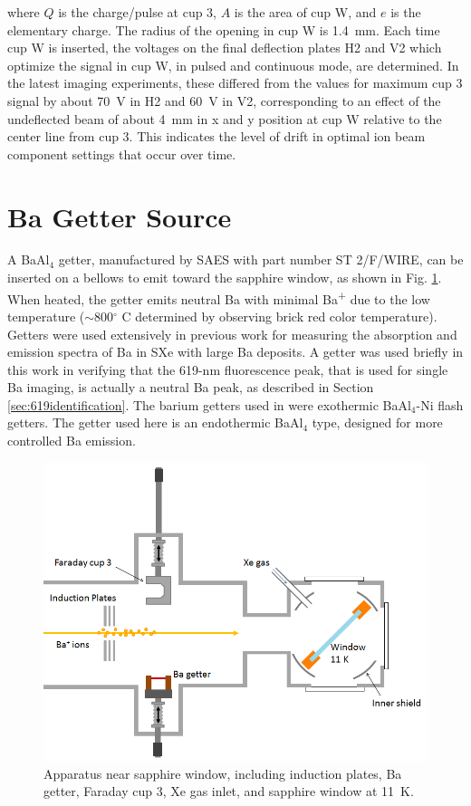 \noindent
where $Q$ is the charge/pulse at cup 3, $A$ is the area of cup W, and $e$ is the elementary charge.  The radius of the opening in cup W is 1.4~mm.  Each time cup W is inserted, the voltages on the final deflection plates H2 and V2 which optimize the signal in cup W, in pulsed and continuous mode, are determined.  In the latest imaging experiments, these differed from the values for maximum cup 3 signal by about 70~V in H2 and 60~V in V2, corresponding to an effect of the undeflected beam of about 4~mm in x and y position at cup W relative to the center line from cup 3.  This indicates the level of drift in optimal ion beam component settings that occur over time.

\section{Ba Getter Source}
\label{sec:getter}

A BaAl$_{4}$ getter, manufactured by SAES with part number ST 2/F/WIRE, can be inserted on a bellows to emit toward the sapphire window, as shown in Fig. \ref{fig:endOfBeamBa}.  When heated, the getter emits neutral Ba with minimal Ba\textsuperscript{+} due to the low temperature ($\sim$800$^{\circ}$ C determined by observing brick red color temperature).  Getters were used extensively in previous work \cite{Brian} for measuring the absorption and emission spectra of Ba in SXe with large Ba deposits.  A getter was used briefly in this work in verifying that the 619-nm fluorescence peak, that is used for single Ba imaging, is actually a neutral Ba peak, as described in Section \ref{sec:619identification}.  The barium getters used in \cite{Brian} were exothermic BaAl$_{4}$-Ni flash getters.  The getter used here is an endothermic BaAl$_{4}$ type, designed for more controlled Ba emission.  


\begin{figure} %
        \centering
                \includegraphics[width=.75\textwidth]{figures/window_etc_justBa.png}
                \caption{Apparatus near sapphire window, including induction plates, Ba getter, Faraday cup 3, Xe gas inlet, and sapphire window at 11~K.}
\label{fig:endOfBeamBa}
\end{figure}

